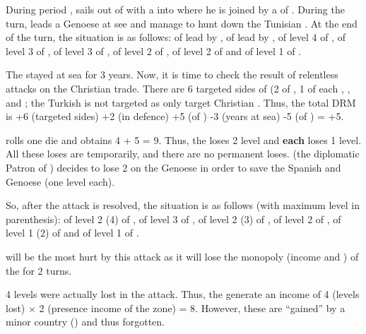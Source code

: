 \begin{exemple}
  During period ,  sails out of
  \villeAlger with a \corsaire\faceplus into  where he is joined
  by a \corsaire\facemoins of \paysTunisie. During the turn,  leads a Genoese \FLEET\facemoins at see and manage to hunt down the
  Tunisian \corsaire. At the end of the turn, the situation is as follows:
  \corsaire\faceplus of \paysAlgerie lead by ,
  \FLEET\facemoins of \paysGenes lead by ,
  \TradeFLEET\faceplus of level 4 of \FRA, \TradeFLEET\facemoins of level 3 of
  \paysHollande, \TradeFLEET\facemoins of level 3 of \paysGenes,
  \TradeFLEET\facemoins of level 2 of \SPA, \TradeFLEET\facemoins of level 2
  of \VEN and \TradeFLEET\facemoins of level 1 of \TUR.

  The \corsaire stayed at sea for 3 years. Now, it is time to check the result
  of  relentless attacks on the Christian trade. There are 6
  targeted sides of \TradeFLEET (2 of \FRA, 1 of each \paysHollande,
  \paysGenes, \HIS and \VEN; the Turkish \TradeFLEET is not targeted as
  \Barbaresques only target Christian \TradeFLEET. Thus, the total DRM is +6
  (targeted sides) +2 (\TradeFLEET\facemoins in defence) +5 (\Man of ) -3 (years at sea) -5 (\Man of ) = +5.

  \TUR rolls one die and obtains 4 + 5 = 9. Thus, the \TradeFLEET\faceplus
  loses 2 level and \textbf{each} \TradeFLEET\facemoins loses 1 level. All
  these loses are temporarily, and there are no permanent loses. \HIS (the
  diplomatic Patron of \paysGenes) decides to lose 2 \NGD on the Genoese
  \FLEET in order to save the Spanish and Genoese \TradeFLEET (one level
  each).

  So, after the attack is resolved, the situation is as follows (with maximum
  level in parenthesis): \TradeFLEET\facemoins of level 2 (4) of \FRA,
  \TradeFLEET\facemoins of level 3 of \paysGenes, \TradeFLEET\facemoins of
  level 2 (3) of \paysHollande, \TradeFLEET\facemoins of level 2 of \HIS,
  \TradeFLEET\facemoins of level 1 (2) of \VEN and \TradeFLEET\facemoins of
  level 1 of \TUR.

  \FRA will be the most hurt by this attack as it will lose the monopoly
  (income and \VPs) of the \STZ for 2 turns.

  4 levels were actually lost in the attack. Thus, the \corsaire generate an
  income of 4 (levels lost) $\times$ 2 (presence income of the zone) =
  8\ducats. However, these are ``gained'' by a minor country (\paysAlgerie)
  and thus forgotten.
\end{exemple}

